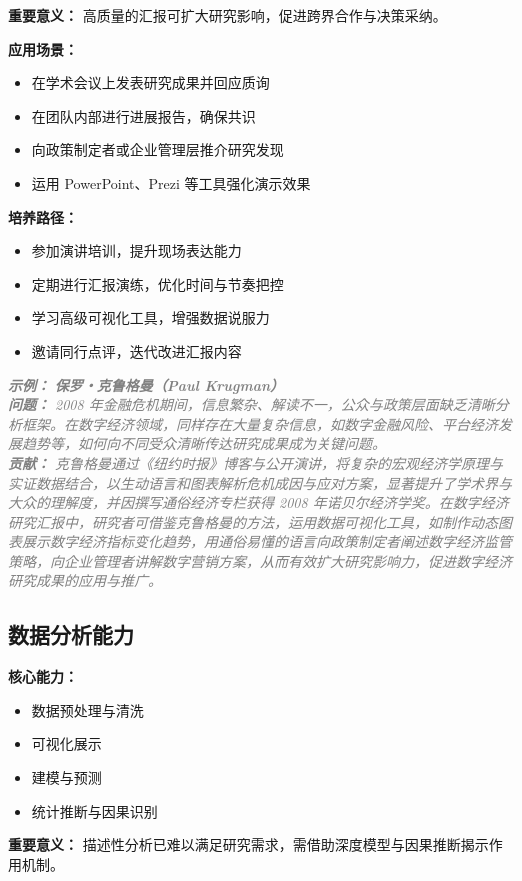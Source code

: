 \documentclass[lang=cn,12pt,a4paper]{elegantpaper}
\newcommand{\skillexample}[1]{\smallskip\noindent\textcolor{gray}{\textit{\footnotesize\textbf{示例：}} \textit{\footnotesize #1}}}
\begin{document}
\textbf {重要意义：} 高质量的汇报可扩大研究影响，促进跨界合作与决策采纳。

\textbf {应用场景：}
\begin {itemize}
\item 在学术会议上发表研究成果并回应质询
\item 在团队内部进行进展报告，确保共识
\item 向政策制定者或企业管理层推介研究发现
\item 运用 PowerPoint、Prezi 等工具强化演示效果
\end {itemize}

\textbf {培养路径：}
\begin {itemize}
\item 参加演讲培训，提升现场表达能力
\item 定期进行汇报演练，优化时间与节奏把控
\item 学习高级可视化工具，增强数据说服力
\item 邀请同行点评，迭代改进汇报内容
\end {itemize}

\skillexample {
\textbf {保罗・克鲁格曼（Paul Krugman）}\\
\textbf {问题：} 2008 年金融危机期间，信息繁杂、解读不一，公众与政策层面缺乏清晰分析框架。在数字经济领域，同样存在大量复杂信息，如数字金融风险、平台经济发展趋势等，如何向不同受众清晰传达研究成果成为关键问题。\\
\textbf {贡献：} 克鲁格曼通过《纽约时报》博客与公开演讲，将复杂的宏观经济学原理与实证数据结合，以生动语言和图表解析危机成因与应对方案，显著提升了学术界与大众的理解度，并因撰写通俗经济专栏获得 2008 年诺贝尔经济学奖。在数字经济研究汇报中，研究者可借鉴克鲁格曼的方法，运用数据可视化工具，如制作动态图表展示数字经济指标变化趋势，用通俗易懂的语言向政策制定者阐述数字经济监管策略，向企业管理者讲解数字营销方案，从而有效扩大研究影响力，促进数字经济研究成果的应用与推广。
}

\subsection {数据分析能力}\label {sec:data_analysis}
\textbf {核心能力：}
\begin {itemize}
\item 数据预处理与清洗
\item 可视化展示
\item 建模与预测
\item 统计推断与因果识别
\end {itemize}

\textbf {重要意义：} 描述性分析已难以满足研究需求，需借助深度模型与因果推断揭示作用机制。
\end{document}
